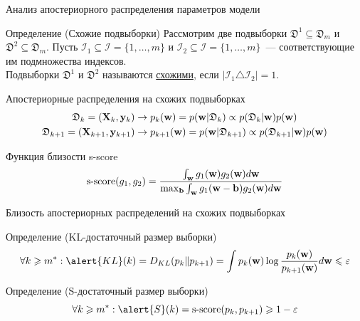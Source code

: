 \documentclass[aspectratio=169]{beamer}
\begin{document}
\begin{frame}{Анализ апостериорного распределения параметров модели}
    \begin{block}{Определение (Схожие подвыборки)}
        \vspace{-0.2cm}
        Рассмотрим две подвыборки $\mathfrak{D}^1 \subseteq \mathfrak{D}_m$ и $\mathfrak{D}^2 \subseteq \mathfrak{D}_m$. Пусть $\mathcal{I}_1 \subseteq \mathcal{I} = \{ 1, \ldots, m \}$ и $\mathcal{I}_2 \subseteq \mathcal{I} = \{ 1, \ldots, m \}$~--- соответствующие им подмножества индексов.\\
        Подвыборки $\mathfrak{D}^1$ и $\mathfrak{D}^2$ называются \underline{схожими}, если $\left| \mathcal{I}_1 \triangle \mathcal{I}_2 \right| = 1$.
        \vspace{-0.3cm}
    \end{block}
    \begin{block}{Апостериорные распределения на схожих подвыборках}
        \vspace{-0.7cm}
        \begin{align*}
            \mathfrak{D}_k = (\mathbf{X}_k, \mathbf{y}_k) &\to p_k(\mathbf{w}) = p(\mathbf{w} | \mathfrak{D}_k) \propto p(\mathfrak{D}_k | \mathbf{w}) p(\mathbf{w}) \\
            \mathfrak{D}_{k+1} = (\mathbf{X}_{k+1}, \mathbf{y}_{k+1}) &\to p_{k+1}(\mathbf{w}) = p(\mathbf{w} | \mathfrak{D}_{k+1}) \propto p(\mathfrak{D}_{k+1} | \mathbf{w}) p(\mathbf{w})
        \end{align*}
        \vspace{-1cm}
    \end{block}
    \begin{block}{Функция близости s-score}
        \vspace{-0.3cm}
        \[ \mathrm{s\text{-}score}(g_1, g_2) = \dfrac{\int_{\mathbf{w}} g_1(\mathbf{w}) g_2(\mathbf{w}) d\mathbf{w}}{\max_{\mathbf{b}} \int_{\mathbf{w}} g_1(\mathbf{w} - \mathbf{b}) g_2(\mathbf{w}) d\mathbf{w}} \]
    \end{block}
\end{frame}

\begin{frame}{Близость апостериорных распределений на схожих подвыборках}
    \begin{figure}
        
    \end{figure}
    \begin{block}{Определение (\alert{KL}-достаточный размер выборки)}
        \[ \forall k \geqslant m^*: \alert{KL}(k) = D_{KL}(p_k \| p_{k+1}) = \int p_k(\bw) \log{\dfrac{p_k(\bw)}{p_{k+1}(\bw)}} d\bw \leqslant \varepsilon \]
    \end{block} 
    \begin{block}{Определение (\alert{S}-достаточный размер выборки)}
        \[ \forall k \geqslant m^*: \alert{S}(k) = \mathrm{s\text{-}score}(p_k, p_{k+1}) \geqslant 1-\varepsilon \]
    \end{block} 
\end{frame}
\end{document}
